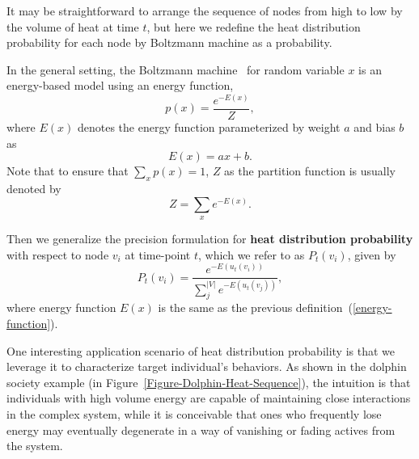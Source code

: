 \documentclass[10pt,journal,compsoc]{IEEEtran}
\begin{document}
It may be straightforward to arrange the sequence of nodes from high to low by the volume of heat at time $t$, but here we redefine the heat distribution probability for each node by Boltzmann machine as a probability.


In the general setting, the Boltzmann machine~\cite{boltzmann-machine} for random variable $x$ is an energy-based model using an energy function,
\begin{equation}\label{Boltzmann-distribution}
  p(x) = \frac{e^{-E(x)}}{Z},
\end{equation}
where $E(x)$ denotes the energy function parameterized by weight $a$ and bias $b$ as
\begin{equation}\label{energy-function}
  E(x) = ax + b.
\end{equation}
Note that to ensure that $\sum \limits_{x}p(x) = 1$, $Z$ as the partition function is usually denoted by
\begin{equation}\label{Boltzmann-distribution}
  Z = \sum \limits_{x} e^{-E(x)}.
\end{equation}


Then we generalize the precision formulation for \textbf{heat distribution probability} with respect to node $v_{i}$ at time-point $t$, which we refer to as $P_{t}(v_{i})$, given by
\begin{equation}\label{Boltzmann-distribution}
  P_{t}(v_{i}) = \frac{e^{-E(u_{t}(v_{i}))}}{\sum \limits_{j}^{|V|} e^{-E(u_{t}(v_{j}))}},
\end{equation}
where energy function $E(x)$ is the same as the previous definition~(\ref{energy-function}).


One interesting application scenario of heat distribution probability is that we leverage it to characterize target individual's behaviors. As shown in the dolphin society example (in Figure~\ref{Figure-Dolphin-Heat-Sequence}), the intuition is that individuals with high volume energy are capable of maintaining close interactions in the complex system, while it is conceivable that ones who frequently lose energy may eventually degenerate in a way of vanishing or fading actives from the system.
\end{document}
